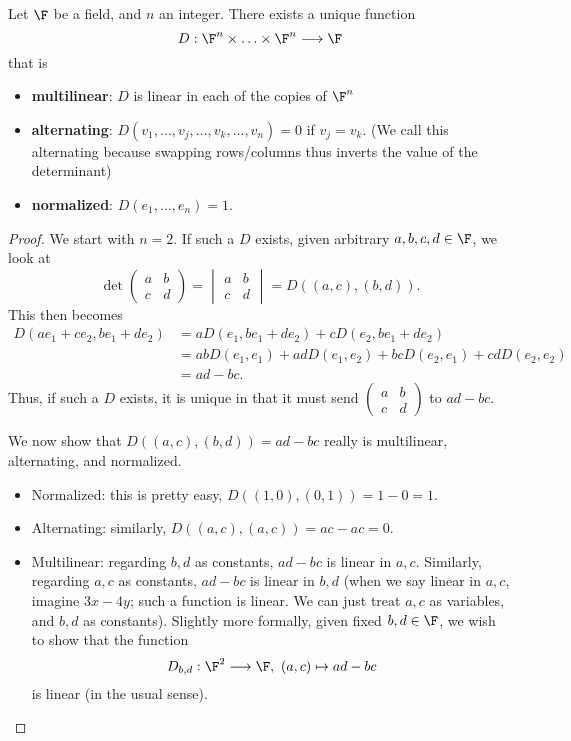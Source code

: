 \documentclass[math0540-lecture-notes.tex]{subfiles}
\begin{document}
\begin{theorem}{}
  Let $\F$ be a field, and $n$ an integer. There exists a unique function \[
    D:\F^n\times \ldots\times \F^n \longrightarrow \F
  \] that is
  \begin{itemize}
    \item \textbf{multilinear}: $D$ is linear in each of the copies of $\F^n$
    \item \textbf{alternating}: $D(v_1,\ldots,v_j,\ldots,v_k,\ldots,v_n)=0$ if $v_j=v_k$. (We call
      this alternating because swapping rows/columns thus inverts the value of the determinant)
    \item \textbf{normalized}: $D(e_1,\ldots,e_n)=1$.
  \end{itemize}
\end{theorem}
\begin{proof}[Proof]
  We start with $n=2$. If such a $D$ exists, given arbitrary $a,b,c,d\in \F$, we look at \[
    \det{\begin{pmatrix} a&b\\c&d \end{pmatrix} }=\begin{vmatrix} a&b\\c&d \end{vmatrix}
    =D((a,c),(b,d))
  .\] This then becomes
  \begin{align*}
    D(ae_1+ce_2,be_1+de_2)&=aD(e_1,be_1+de_2)+cD(e_2,be_1+de_2)\\
                          &=abD(e_1,e_1)+adD(e_1,e_2)+bcD(e_2,e_1)+cdD(e_2,e_2)\\
                          &=ad-bc
  .\end{align*}
    Thus, if such a $D$ exists, it is unique in that it must send $\begin{pmatrix} a&b\\c&d
    \end{pmatrix}$ to $ad-bc$.

    We now show that $D((a,c),(b,d))=ad-bc$ really is multilinear, alternating, and normalized.
    \begin{itemize}
      \item Normalized: this is pretty easy, $D((1,0),(0,1))=1-0=1$.
      \item Alternating: similarly, $D((a,c),(a,c))=ac-ac=0$.
      \item Multilinear: regarding $b,d$ as constants, $ad-bc$ is linear in $a,c$. Similarly,
        regarding $a,c$ as constants, $ad-bc$ is linear in $b,d$ (when we say linear in $a,c$,
        imagine $3x-4y$; such a function is linear. We can just treat $a,c$ as variables, and $b,d$
        as constants). Slightly more formally, given fixed $b,d\in \F$, we wish to show that the
        function \[
          D_{b,d}:\F^2\longrightarrow\F,\ (a,c)\mapsto ad-bc
        \] is linear (in the usual sense).
    \end{itemize}


\end{proof}
\end{document}
